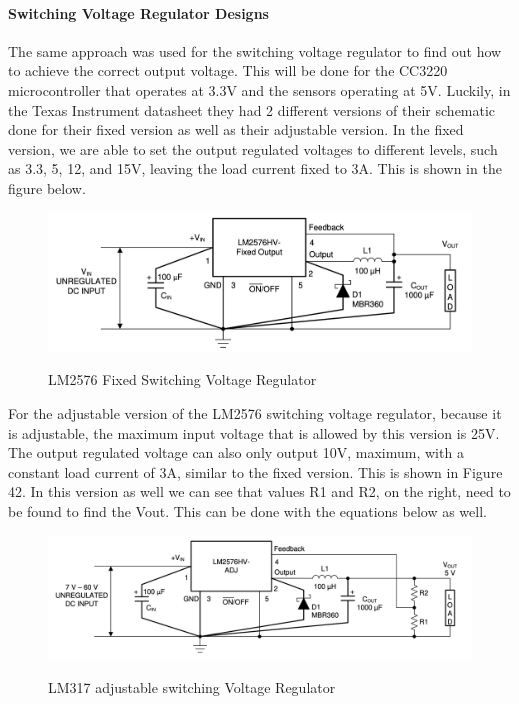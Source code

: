 \paragraph{Switching Voltage Regulator Designs}
The same approach was used for the switching voltage regulator to find out how to achieve the correct output voltage. This will be done for the CC3220 microcontroller that operates at 3.3V and the sensors operating at 5V. Luckily, in the Texas Instrument datasheet they had 2 different versions of their schematic done for their fixed version as well as their adjustable version. In the fixed version, we are able to set the output regulated voltages to different levels, such as 3.3, 5, 12, and 15V, leaving the load current fixed to 3A. This is shown in the figure below.\par
\begin{figure}[H]
    \centering
    \caption{LM2576 Fixed Switching Voltage Regulator}
    \includegraphics[width=\textwidth]{images/LM2576_Fixed.png}
    \label{fig:fixed-switching-voltage-regulator}
\end{figure}
For the adjustable version of the LM2576 switching voltage regulator, because it is adjustable, the maximum input voltage that is allowed by this version is 25V. The output regulated voltage can also only output 10V, maximum, with a constant load current of 3A, similar to the fixed version. This is shown in Figure 42. In this version as well we can see that values R1 and R2, on the right, need to be found to find the Vout. This can be done with the equations below as well.\par
\begin{figure}[H]
    \centering
    \caption{LM317 adjustable switching Voltage Regulator}
    \includegraphics[width=\textwidth]{images/LM2576_Adjustable.png}
    \label{fig:adj-switching-voltage-regulator}
\end{figure}


